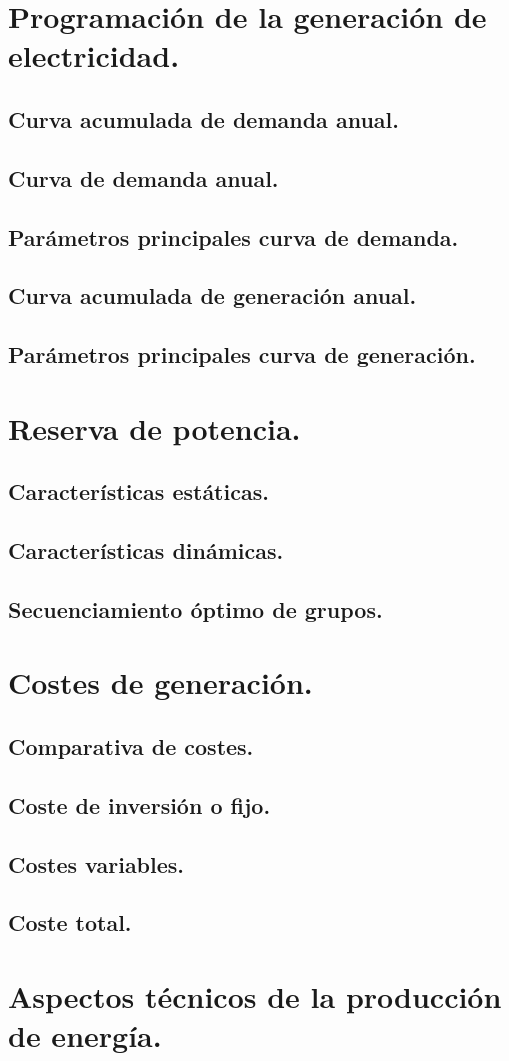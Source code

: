 \section{Programación de la generación de electricidad.}
\subsection{Curva acumulada de demanda anual.}
\subsection{Curva de demanda anual.}
\subsection{Parámetros principales curva de demanda.}
\subsection{Curva acumulada de generación anual.}
\subsection{Parámetros principales curva de generación.}
\section{Reserva de potencia.}
\subsection{Características estáticas.}
\subsection{Características dinámicas.}
\subsection{Secuenciamiento óptimo de grupos.}
\section{Costes de generación.}
\subsection{Comparativa de costes.}
\subsection{Coste de inversión o fijo.}
\subsection{Costes variables.}
\subsection{Coste total.}
\section{Aspectos técnicos de la producción de energía.}